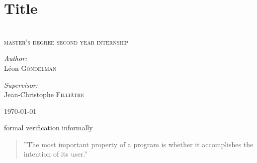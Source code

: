 \section*{Title}
\begin{frame}
\begin{center}
\vspace{-1.cm}

\textsc{}\\
 \textsc{ \scriptsize master's degree second year internship}\\[2cm]
\bigskip
\begin{minipage}{0.3\textwidth}
\begin{flushleft} 
\emph{Author:}\\
L\'eon \textsc{Gondelman}
\end{flushleft}
\end{minipage}
\begin{minipage}{0.5\textwidth}
\begin{flushright} 
\emph{Supervisor:} \\
Jean-Christophe \textsc{Filli\^atre}
\end{flushright}
\end{minipage}

\vfill

{\small \today}



\end{center}
\end{frame}





\begin{frame}{formal verification informally}
\begin{quotation}
 ''The most important property of a program is whether it accomplishes the intention of its user.''\\
\hfill{}
\end{quotation}
\bigskip
\end{frame}

